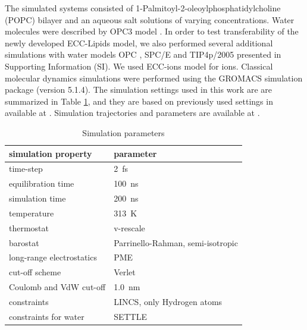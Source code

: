 \documentclass[aip,jcp,twocolumn]{revtex4}
\begin{document}
The simulated systems consisted of 1-Palmitoyl-2-oleoylphosphatidylcholine (POPC) bilayer and an aqueous salt solutions of varying concentrations.
Water molecules were described by OPC3 model \cite{Izadi16}.
In order to test transferability of the newly developed ECC-Lipids model, 
we also performed several additional simulations with water models 
OPC \cite{Izadi14}, SPC/E \cite{Berendsen1987} and TIP4p/2005 \cite{Abascal2005}
presented in Supporting Information (SI). 
We used ECC-ions model for ions. \cite{jungwirth17-new-paper-to-be-published, kohagen16, Pluharova2014} %
Classical molecular dynamics simulations were performed using the GROMACS \cite{Abraham15} simulation package (version 5.1.4).  
The simulation settings used in this work are 
are summarized in Table \ref{tbl:mdpar}, 
and they are based on previously used settings in \cite{catte16} available at \cite{lipid14POPC0mMNaClfiles}. 
Simulation trajectories and parameters are available at \cite{??} .

\begin{table}[btp]
  \caption{Simulation parameters}
  \label{tbl:mdpar}
  \begin{tabular}{ll}
    simulation property & parameter   \\
    \hline
    time-step           & 2~fs         \\
    equilibration time  & 100~ns  \\
    simulation time     & 200~ns  \\
    temperature         & 313~K       \\
    thermostat          & v-rescale  \cite{bussi07}   \\
    barostat            & Parrinello-Rahman, semi-isotropic \cite{parrinello81} \\
    long-range electrostatics & PME  \cite{darden93}  \\
    cut-off scheme      & Verlet \cite{Pall13}      \\
    Coulomb and VdW cut-off & 1.0~nm \\
    constraints         & LINCS, only Hydrogen atoms \cite{hess97} \\
    constraints for water & SETTLE  \cite{miyamoto92} \\
    \hline
  \end{tabular}
\end{table}
\end{document}
